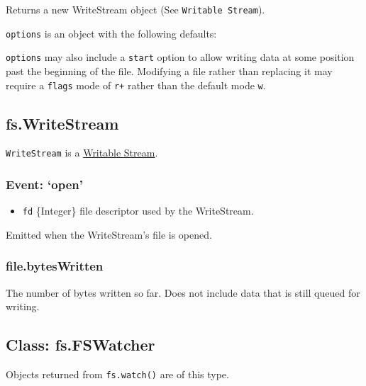 Returns a new WriteStream object (See \texttt{Writable Stream}).

\texttt{options} is an object with the following defaults:

\begin{Shaded}
\begin{Highlighting}[]
\NormalTok{\{ }\NormalTok{: }\NormalTok{,}
  \NormalTok{: } \NormalTok{\}}
\end{Highlighting}
\end{Shaded}

\texttt{options} may also include a \texttt{start} option to allow
writing data at some position past the beginning of the file. Modifying
a file rather than replacing it may require a \texttt{flags} mode of
\texttt{r+} rather than the default mode \texttt{w}.

\subsection{fs.WriteStream}

\texttt{WriteStream} is a
\href{stream.html\#stream\_writable\_stream}{Writable Stream}.

\subsubsection{Event: `open'}

\begin{itemize}
\item
  \texttt{fd} \{Integer\} file descriptor used by the WriteStream.
\end{itemize}

Emitted when the WriteStream's file is opened.

\subsubsection{file.bytesWritten}

The number of bytes written so far. Does not include data that is still
queued for writing.

\subsection{Class: fs.FSWatcher}

Objects returned from \texttt{fs.watch()} are of this type.

